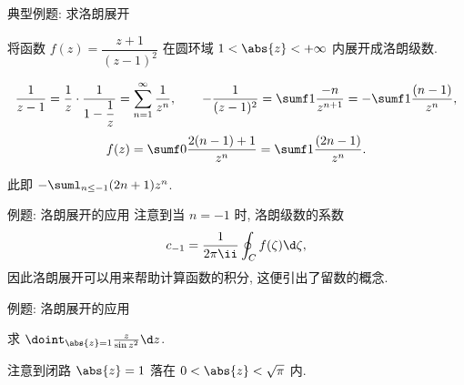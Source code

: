\begin{frame}{典型例题: 求洛朗展开}
	\onslide<+->
	\begin{exercise}
		将函数 $f(z)=\dfrac{z+1}{(z-1)^2}$ 在圆环域 $1<\abs{z}<+\infty$ 内展开成洛朗级数.
	\end{exercise}
	\onslide<+->
	\begin{answer}
		\begin{align*}
			\frac1{z-1}=\frac1z\cdot\frac1{1-\dfrac1z}=\sum_{n=1}^{\infty} \frac1{z^n},\qquad
			-\frac1{(z-1)^2}=\sumf1 \frac{-n}{z^{n+1}}=-\sumf1 \frac{(n-1)}{z^n},
		\end{align*}
		\[
			f(z)=\sumf0 \frac{2(n-1)+1}{z^n}
			=\sumf1\frac{(2n-1)}{z^n}.
		\]
	\end{answer}
	\onslide<+->
	此即 $-\suml_{n\le -1}(2n+1)z^n$.
\end{frame}


\begin{frame}{例题: 洛朗展开的应用}
	\onslide<+->
	注意到当 $n=-1$ 时, 洛朗级数的系数
	\[c_{-1}=\frac1{2\pi\ii}\oint_C f(\zeta)\d\zeta,
	\]
	\onslide<+->
	因此洛朗展开可以用来帮助计算函数的积分,
	\onslide<+->
	这便引出了\alert{留数}的概念.
\end{frame}






\begin{frame}{例题: 洛朗展开的应用}
	\onslide<+->
	\begin{example}[nearnext]
		求 $\doint_{\abs{z}=1}\frac{z}{\sin z^2}\d z$.
	\end{example}
	\onslide<+->
	\begin{solution}[nearprev]
		注意到闭路 $\abs{z}=1$ 落在 $0<\abs{z}<\sqrt \pi$ 内.
		\onslide<+->{%
			\[
				f(z)=\frac{z}{\sin z^2}
				=\frac{z}{z^2-\dfrac{z^6}{3!}+\dfrac{z^{10}}{5!}+\cdots}
				\onslide<+->{=\frac1z+\frac{z^3}6+\cdots}
			\]
		}\onslide<+->{%
			故 $\doint_Cf(z)\d z=2\pi\ii c_{-1}=2\pi\ii$.
		}
	\end{solution}
\end{frame}
